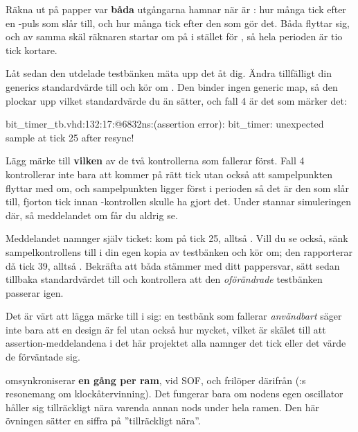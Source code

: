  Räkna ut på papper var \textbf{båda} utgångarna hamnar när  är
: hur många tick efter en -puls som  slår till, och hur många
tick efter den som  gör det. Båda flyttar sig, och av samma skäl \textemdash{}
räknaren startar om på  i stället för , så hela perioden är tio tick kortare.

Låt sedan den utdelade testbänken mäta upp det åt dig. Ändra tillfälligt din generics standardvärde
till  och kör om . Den binder ingen generic map, så den plockar upp
vilket standardvärde du än sätter, och fall 4 är det som märker det:

\begin{console}
bit_timer_tb.vhd:132:17:@6832ns:(assertion error): bit_timer: unexpected sample at tick 25 after resync!
\end{console}

Lägg märke till \textbf{vilken} av de två kontrollerna som fallerar först. Fall 4 kontrollerar inte
bara att  kommer på rätt tick utan också att sampelpunkten flyttar med om, och
sampelpunkten ligger först i perioden \textemdash{} så det är den som slår till, fjorton tick innan
-kontrollen skulle ha gjort det. Under  stannar
simuleringen där, så meddelandet om  får du aldrig se.

Meddelandet namnger själv ticket:  kom på tick 25, alltså
. Vill du se  också, sänk sampelkontrollens
 till  i din egen kopia av testbänken och kör om; den
rapporterar då tick 39, alltså . Bekräfta att båda stämmer
med ditt pappersvar, sätt sedan tillbaka standardvärdet till  och kontrollera att den
\emph{oförändrade} testbänken passerar igen.

Det är värt att lägga märke till i sig: en testbänk som fallerar \emph{användbart} säger inte bara
att en design är fel utan också hur mycket, vilket är skälet till att assertion-meddelandena i det
här projektet alla namnger det tick eller det värde de förväntade sig.

\label{c12:ex:drift}
 omsynkroniserar \textbf{en gång per ram}, vid SOF, och frilöper därifrån
(:s resonemang om klockåtervinning). Det fungerar bara om nodens egen
oscillator håller sig tillräckligt nära varenda annan nods under hela ramen. Den här övningen sätter
en siffra på ”tillräckligt nära”.

